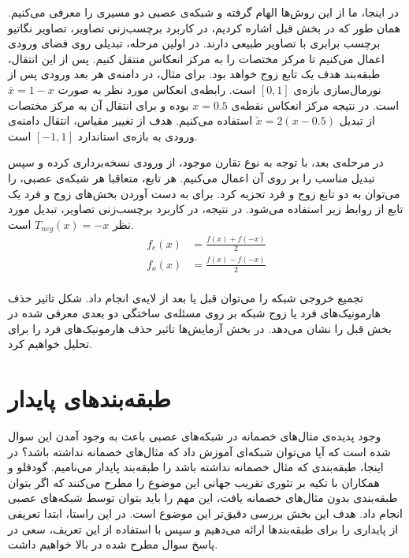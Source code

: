 \documentclass[12pt,onecolumn,a4paper]{article}
\begin{document}
در اینجا، ما از این روش‌ها الهام گرفته و شبکه‌ی عصبی دو مسیری را معرفی می‌کنیم. همان طور که در بخش قبل اشاره کردیم، در کاربرد برچسب‌زنی تصاویر، تصاویر نگاتیو برچسب برابری با تصاویر طبیعی دارند. در اولین مرحله، تبدیلی روی فضای ورودی اعمال می‌کنیم تا مرکز مختصات را به مرکز انعکاس منتقل کنیم. پس از این انتقال، طبقه‌بند هدف یک تابع زوج خواهد بود. برای مثال، در  دامنه‌ی هر بعد ورودی پس از نورمال‌سازی بازه‌ی $[0,1]$ است. رابطه‌ی انعکاس مورد نظر به صورت $\bar{x}=1-x$ است. در نتیجه مرکز انعکاس نقطه‌ی $x=0.5$ بوده و برای انتقال آن به مرکز مختصات از تبدیل $\tilde{x}=2(x-0.5)$ استفاده می‌کنیم. هدف از تغییر مقیاس، انتقال دامنه‌ی ورودی به بازه‌ی استاندارد $[-1,1]$ است.

در مرحله‌ی بعد، با توجه به نوع تقارن موجود، از ورودی نسخه‌برداری کرده و سپس تبدیل مناسب را بر روی آن اعمال می‌کنیم. هر تابع، متعاقبا هر شبکه‌ی عصبی، را می‌توان به دو تابع زوج و فرد تجزیه کرد. برای به دست آوردن بخش‌های زوج و فرد یک تابع از روابط زیر استفاده می‌شود. در نتیجه، در کاربرد برچسب‌زنی تصاویر، تبدیل مورد نظر $T_{neg}(x)=-x$ است.
\begin{align*}
    f_e(x)&=\frac{f(x)+f(-x)}{2}\\
    f_o(x)&=\frac{f(x)-f(-x)}{2}\\
\end{align*}

تجمیع خروجی شبکه را می‌توان قبل یا بعد از لایه‌ی  انجام داد. شکل تاثیر حذف هارمونیک‌های فرد یا زوج شبکه بر روی  مسئله‌ی ساختگی دو بعدی معرفی شده در بخش قبل را نشان می‌دهد. در بخش آزمایش‌ها تاثیر حذف هارمونیک‌های فرد را برای  تحلیل خواهیم کرد.

\section{طبقه‌بند‌های پایدار}
وجود پدیده‌ی مثال‌های خصمانه در شبکه‌های عصبی باعث به وجود آمدن این سوال شده است که آیا می‌توان شبکه‌ای آموزش داد که مثال‌های خصمانه نداشته باشد؟ در اینجا، طبقه‌بندی که مثال خصمانه نداشته باشد را طبقه‌بند پایدار می‌نامیم. گودفلو و همکاران\cite{goodfellow2014explaining} با تکیه بر تئوری تقریب جهانی این موضوع را مطرح می‌کنند که اگر بتوان طبقه‌بندی بدون مثال‌های خصمانه یافت، این مهم را باید بتوان توسط شبکه‌های عصبی انجام داد. هدف این بخش بررسی دقیق‌تر این موضوع است. در این راستا، ابتدا تعریفی از پایداری را برای طبقه‌بندها ارائه می‌دهیم و سپس با استفاده از این تعریف، سعی در پاسخ سوال مطرح شده در بالا خواهیم داشت.
\end{document}

